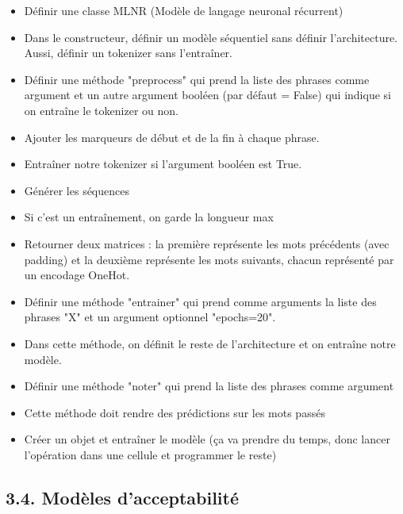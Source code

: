 \documentclass[11pt, a4paper]{article}
\begin{document}
\begin{itemize}
	\item Définir une classe MLNR (Modèle de langage neuronal récurrent)
	\item Dans le constructeur, définir un modèle séquentiel sans définir l'architecture. 
	Aussi, définir un tokenizer sans l'entraîner.
	\item Définir une méthode "preprocess" qui prend la liste des phrases comme argument et un autre argument booléen (par défaut = False) qui indique si on entraîne le tokenizer ou non.
	\item Ajouter les marqueurs de début et de la fin à chaque phrase.
	\item Entraîner notre tokenizer si l'argument booléen est True.
	\item Générer les séquences
	\item Si c'est un entraînement, on garde la longueur max
	\item Retourner deux matrices : la première représente les mots précédents (avec padding) et la deuxième représente les mots suivants, chacun représenté par un encodage OneHot.
	\item Définir une méthode "entrainer" qui prend comme arguments la liste des phrases "X" et un argument optionnel "epochs=20".
	\item Dans cette méthode, on définit le reste de l'architecture et on entraîne notre modèle.
	\item Définir une méthode "noter" qui prend la liste des phrases comme argument 
	\item Cette méthode doit rendre des prédictions sur les mots passés
	\item Créer un objet et entraîner le modèle (ça va prendre du temps, donc lancer l'opération dans une cellule et programmer le reste)
\end{itemize}

\subsection*{3.4. Modèles d'acceptabilité}
\end{document}
